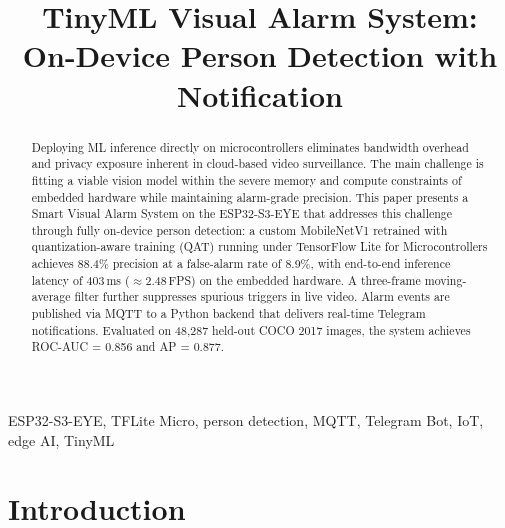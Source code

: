 \documentclass[conference]{IEEEtran}
\begin{document}
\title{TinyML Visual Alarm System:\\
On-Device Person Detection with Notification}

\author{%
}

\maketitle

\begin{abstract}
Deploying ML inference directly on microcontrollers eliminates bandwidth overhead and privacy exposure inherent in cloud-based video surveillance. The main challenge is fitting a viable vision model within the severe memory and compute constraints of embedded hardware while maintaining alarm-grade precision. This paper presents a Smart Visual Alarm System on the ESP32-S3-EYE that addresses this challenge through fully on-device person detection: a custom MobileNetV1 retrained with quantization-aware training (QAT) running under TensorFlow Lite for Microcontrollers achieves 88.4\% precision at a false-alarm rate of 8.9\%, with end-to-end inference latency of 403\,ms ($\approx$2.48\,FPS) on the embedded hardware. A three-frame moving-average filter further suppresses spurious triggers in live video. Alarm events are published via MQTT to a Python backend that delivers real-time Telegram notifications. Evaluated on 48,287 held-out COCO 2017 images, the system achieves ROC-AUC = 0.856 and AP = 0.877.
\end{abstract}

\begin{IEEEkeywords}
ESP32-S3-EYE, TFLite Micro, person detection, MQTT, Telegram Bot, IoT,
edge AI, TinyML
\end{IEEEkeywords}

\section{Introduction}
\label{sec:intro}
\end{document}
